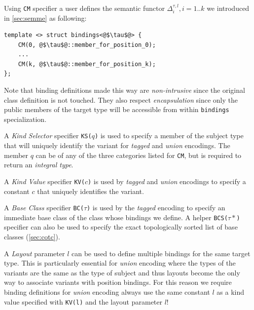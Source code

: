 \documentclass[preprint]{sigplanconf}
\makeatletter
\DeclareRobustCommand{\code}[1]{{\lstinline[breaklines=false,escapechar=@]{#1}}}
\makeatother
\begin{document}
Using \code{CM} specifier a user defines the semantic functor 
$\Delta_i^{\tau,l},i=1..k$ we introduced in \textsection\ref{sec:semme} as 
following:

\begin{lstlisting}
template <> struct bindings<@$\tau$@> {
    CM(0, @$\tau$@::member_for_position_0); 
    ...
    CM(k, @$\tau$@::member_for_position_k); 
};
\end{lstlisting}

Note that binding definitions made this way are \emph{non-intrusive} since the 
original class definition is not touched. They also respect \emph{encapsulation} 
since only the public members of the target type will be accessible from within 
\code{bindings} specialization.

A \emph{Kind Selector} specifier \code{KS(}$q$\code{)} is used to specify a member 
of the subject type that will uniquely identify the variant for \emph{tagged} 
and \emph{union} encodings. The member $q$ can be of any of the three categories 
listed for \code{CM}, but is required to return an \emph{integral type}.

A \emph{Kind Value} specifier \code{KV(}$c$\code{)} is used by \emph{tagged} and 
\emph{union} encodings to specify a constant $c$ that uniquely identifies the 
variant.

A \emph{Base Class} specifier \code{BC(}$\tau$\code{)} is used by the \emph{tagged}
encoding to specify an immediate base class of the class whose bindings we 
define. A helper \code{BCS(}$\tau*$\code{)} specifier can also be used to 
specify the exact topologically sorted list of base classes 
(\textsection\ref{sec:cotc}).

A \emph{Layout} parameter $l$ can be used to define multiple bindings for the same 
target type. This is particularly essential for \emph{union} encoding where the 
types of the variants are the same as the type of subject and thus layouts 
become the only way to associate variants with position bindings. For this 
reason we require binding definitions for \emph{union} encoding always use the 
same constant $l$ as a kind value specified with \code{KV(l)} and the layout 
parameter $l$!

\end{document}

